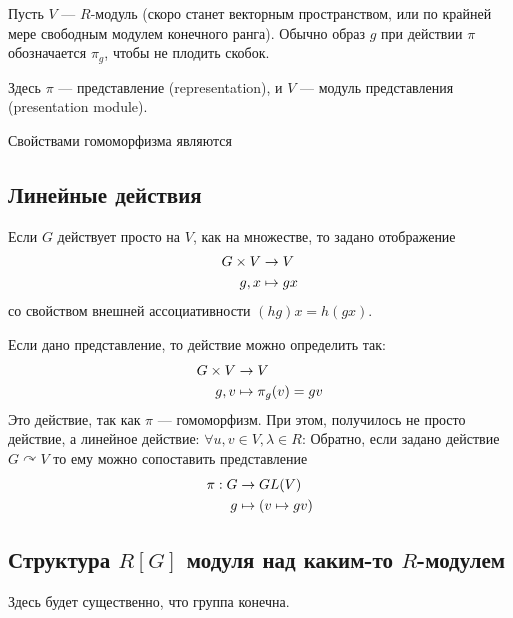 Пусть $V$ --- $R$-модуль (скоро станет векторным пространством, или по крайней мере свободным модулем конечного ранга).
Обычно образ $g$ при действии $\pi$ обозначается $\pi_g$, чтобы не плодить скобок.

Здесь $\pi$ --- представление (representation), и $V$ --- модуль представления (presentation module).

Свойствами гомоморфизма являются

\subsection{Линейные действия}
Если $G$ действует просто на $V$, как на множестве, то задано отображение
\begin{align*}
    G \times V &\rightarrow V \\ g,x&\mapsto gx
\end{align*}
со свойством внешней ассоциативности $(hg)x = h(gx)$.

Если дано представление, то действие можно определить так:
\begin{align*}
    G \times V &\rightarrow V \\ g,v &\mapsto \pi_g(v) = gv
\end{align*}
Это действие, так как $\pi$ --- гомоморфизм.
При этом, получилось не просто действие, а линейное действие: $\forall u, v \in V, \lambda \in R$:
Обратно, если задано действие $G \curvearrowright V$ то ему можно сопоставить представление
\begin{align*}
    \pi: G &\rightarrow GL(V) \\ g &\mapsto (v \mapsto gv)
\end{align*}

\subsection{Структура $R[G]$ модуля над каким-то $R$-модулем}
Здесь будет существенно, что группа конечна.

